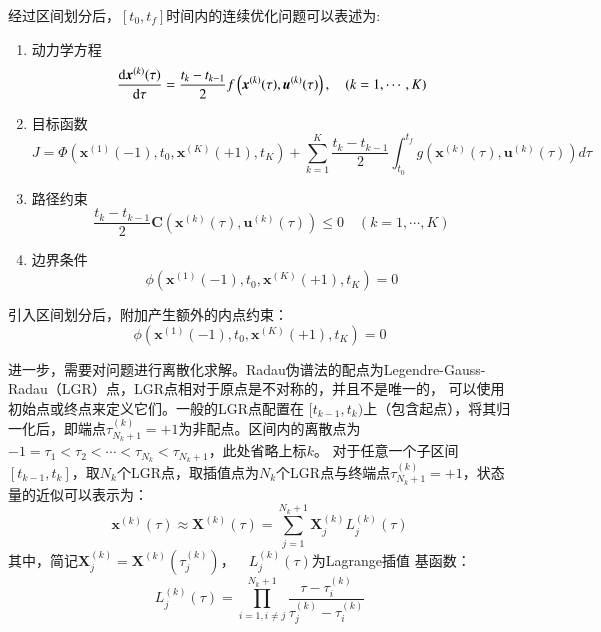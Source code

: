 经过区间划分后，$ [t_0,t_f] $时间内的连续优化问题可以表述为:
\begin{enumerate}
	\item 动力学方程
	\begin{equation}
		\frac{\mathop{}\!\mathrm{d} \boldsymbol{x}^{(k)}(\tau)}{\mathop{}\!\mathrm{d} \tau}=\frac{t_{k}-t_{k-1}}{2} f\left(\boldsymbol{x}^{(k)}(\tau), \boldsymbol{u}^{(k)}(\tau)\right), \quad(k=1, \cdots, K)
	\end{equation}
	\item 目标函数
	\begin{equation}
		J=\Phi\left(\boldsymbol{x}^{(1)}(-1), t_{0}, \boldsymbol{x}^{(K)}(+1), t_{K}\right)+\sum_{k=1}^{K} \frac{t_{k}-t_{k-1}}{2} \int_{t_{0}}^{t_{f}} g\left(\boldsymbol{x}^{(k)}(\tau), \boldsymbol{u}^{(k)}(\tau)\right) d \tau
	\end{equation}
	\item 路径约束
	\begin{equation}
		\frac{t_{k}-t_{k-1}}{2} \boldsymbol{C}\left(\boldsymbol{x}^{(k)}(\tau), \boldsymbol{u}^{(k)}(\tau)\right) \leq 0 \quad(k=1, \cdots, K)
	\end{equation}
	\item 边界条件
	\begin{equation}
		\phi\left(\boldsymbol{x}^{(1)}(-1), t_{0}, \boldsymbol{x}^{(K)}(+1), t_{K}\right)=0
	\end{equation}
\end{enumerate}

引入区间划分后，附加产生额外的内点约束：
\begin{equation}
	\phi\left(\boldsymbol{x}^{(1)}(-1), t_{0}, \boldsymbol{x}^{(K)}(+1), t_{K}\right)=0
\end{equation}

进一步，需要对问题进行离散化求解。Radau伪谱法的配点为Legendre-Gauss-Radau（LGR）点，LGR点相对于原点是不对称的，并且不是唯一的，
可以使用初始点或终点来定义它们。一般的LGR点配置在 $ [t_{k-1},t_k) $上（包含起点），将其归一化后，即端点$ \tau_{N_k+1}^{(k)}=+1 $为非配点。区间内的离散点为$ -1=\tau_1<\tau_2<\cdots<\tau_{N_k}<\tau_{N_k+1} $，此处省略上标$ k $。
对于任意一个子区间$  [t_{k-1},t_k] $，取$ N_k $个LGR点，取插值点为$ N_k $个LGR点与终端点$ \tau_{N_k+1}^{(k)}=+1 $，状态量的近似可以表示为：
\begin{equation}
	\boldsymbol{x}^{(k)}(\tau) \approx \boldsymbol{X}^{(k)}(\tau)=\sum_{j=1}^{N_{k}+1} \boldsymbol{X}_{j}^{(k)} L_{j}^{(k)}(\tau)
	\label{eq:state}
\end{equation}
其中，简记$ \boldsymbol{X}_{j}^{(k)}=\boldsymbol{X}^{(k)}\left(\tau_{j}^{(k)}\right)$，$ \quad L_{j}^{(k)}(\tau) $为Lagrange插值
基函数：
\begin{equation}
	L_{j}^{(k)}(\tau)=\prod_{i=1, i \neq j}^{N_{k}+1} \frac{\tau-\tau_{i}^{(k)}}{\tau_{j}^{(k)}-\tau_{i}^{(k)}}
\end{equation}

